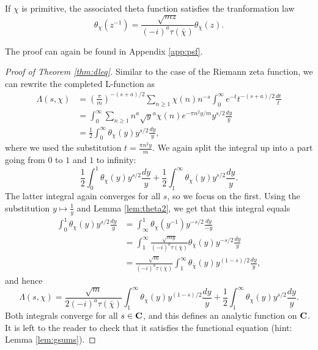 \documentclass{amsart}
\begin{document}
\begin{lemma}
  \label{lem:theta2}
  If $\chi$ is primitive, the associated theta function satisfies the tranformation law
  \[\theta_\chi(z^{-1}) = \frac{\sqrt{mz}}{(-i)^a \tau(\bar\chi)} \theta_{\bar\chi}(z). \]
\end{lemma}
The proof can again be found in Appendix \ref{app:psf}. 

\begin{proof}[Proof of Theorem \ref{thm:dleq}]
  Similar to the case of the Riemann zeta function, we can rewrite the completed L-function as
  \begin{align*}
    \Lambda(s,\chi) &= \left( \frac{\pi}{m} \right)^{-(s+a)/2}\sum_{n\geq 1}\chi(n)n^{-s}\int_0^\infty e^{-t}t^{-(s+a)/2} \frac{dt}{t}\\
                    &= \int_0^\infty \sum_{n\geq 1}n^a\sqrt{y}^a \chi(n)e^{-\pi n^2 y/m} y^{s/2} \frac{dy}{y} \\
                    &=\frac{1}{2} \int_0^\infty \theta_\chi(y) y^{s/2} \frac{dy}{y},
  \end{align*}
  where we used the substitution $t = \frac{\pi n^2 y}{m}$. We again split the integral up into a part going from $0$ to $1$ and $1$ to infinity:
\[\frac{1}{2} \int_0^1 \theta_\chi(y) y^{s/2} \frac{dy}{y} + \frac{1}{2} \int_1^\infty \theta_\chi(y) y^{s/2} \frac{dy}{y}. \]
The latter integral again converges for all $s$, so we focus on the first. Using the substitution $y\mapsto \frac{1}{y}$ and Lemma \ref{lem:theta2}, we get that this integral equals
\begin{align*}
  \int_0^1 \theta_\chi(y) y^{s/2} \frac{dy}{y} &= \int_\infty^1 \theta_\chi(y^{-1}) y^{-s/2} \frac{dy}{-y} \\
                                               &=  \int_1^\infty\frac{\sqrt{my}}{(-i)^a \tau(\bar\chi)} \theta_{\bar\chi}(y) y^{-s/2}\frac{dy}{y} \\
  &= \frac{\sqrt{m}}{(-i)^a \tau(\bar\chi)} \int_1^\infty \theta_{\bar\chi}(y) y^{(1-s)/2}\frac{dy}{y},
\end{align*}
and hence
\[\Lambda(s,\chi) =  \frac{\sqrt{m}}{2(-i)^a \tau(\bar\chi)} \int_1^\infty \theta_{\bar\chi}(y) y^{(1-s)/2}\frac{dy}{y} + \frac{1}{2} \int_1^\infty \theta_\chi(y) y^{s/2} \frac{dy}{y}. \]
Both integrals converge for all $s\in \mathbf{C}$, and this defines an analytic function on $\mathbf{C}$. It is left to the reader to check that it satisfies the functional equation (hint: Lemma \ref{lem:gsums}).
\end{proof}
\end{document}
